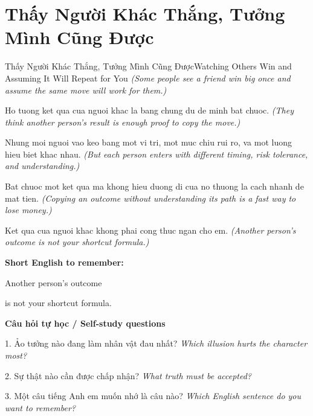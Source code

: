 \section{Thấy Người Khác Thắng, Tưởng Mình Cũng Được}
\begin{truyen}{Thấy Người Khác Thắng, Tưởng Mình Cũng Được}{Watching Others Win and Assuming It Will Repeat for You}
\textit{(Some people see a friend win big once and assume the same move will work for them.)}

Ho tuong ket qua cua nguoi khac la bang chung du de minh bat chuoc.
\textit{(They think another person’s result is enough proof to copy the move.)}

Nhung moi nguoi vao keo bang mot vi tri, mot muc chiu rui ro, va mot luong hieu biet khac nhau.
\textit{(But each person enters with different timing, risk tolerance, and understanding.)}

Bat chuoc mot ket qua ma khong hieu duong di cua no thuong la cach nhanh de mat tien.
\textit{(Copying an outcome without understanding its path is a fast way to lose money.)}

\end{truyen}

\begin{baihoc}
Ket qua cua nguoi khac khong phai cong thuc ngan cho em.
\textit{(Another person’s outcome is not your shortcut formula.)}
\end{baihoc}

\begin{ghinhoanh}
\textbf{Short English to remember:}

Another person’s outcome

is not your shortcut formula.

\end{ghinhoanh}

\begin{tuhocnhanh}
\textbf{Câu hỏi tự học / Self-study questions}

1. Ảo tưởng nào đang làm nhân vật đau nhất? \textit{Which illusion hurts the character most?}

2. Sự thật nào cần được chấp nhận? \textit{What truth must be accepted?}

3. Một câu tiếng Anh em muốn nhớ là câu nào? \textit{Which English sentence do you want to remember?}
\end{tuhocnhanh}
\ngancach

